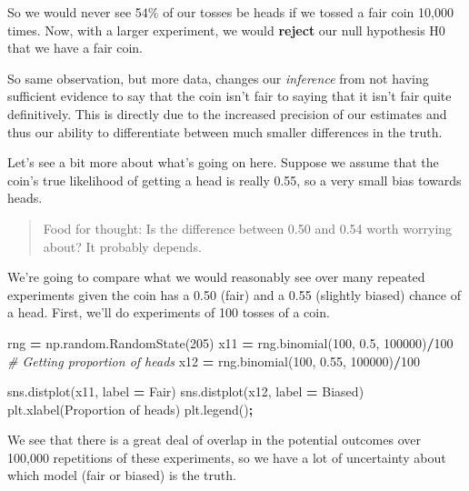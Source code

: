 \documentclass[
  letterpaper,
]{scrbook}
\newenvironment{Shaded}{\begin{snugshade}}{\end{snugshade}}
\newcommand{\CommentTok}[1]{\textcolor[rgb]{0.56,0.35,0.01}{\textit{#1}}}
\newcommand{\DecValTok}[1]{\textcolor[rgb]{0.00,0.00,0.81}{#1}}
\newcommand{\FloatTok}[1]{\textcolor[rgb]{0.00,0.00,0.81}{#1}}
\newcommand{\NormalTok}[1]{#1}
\newcommand{\OperatorTok}[1]{\textcolor[rgb]{0.81,0.36,0.00}{\textbf{#1}}}
\newcommand{\StringTok}[1]{\textcolor[rgb]{0.31,0.60,0.02}{#1}}
\begin{document}
So we would never see 54\% of our tosses be heads if we tossed a fair coin 10,000 times. Now, with a larger experiment, we would \textbf{reject} our null hypothesis H0 that we have a fair coin.

So same observation, but more data, changes our \emph{inference} from not having sufficient evidence to say that the coin isn't fair to saying that it isn't fair quite definitively. This is directly due to the increased precision of our estimates and thus our ability to differentiate between much smaller differences in the truth.

Let's see a bit more about what's going on here. Suppose we assume that the coin's true likelihood of getting a head is really 0.55, so a very small bias towards heads.

\begin{quote}
Food for thought: Is the difference between 0.50 and 0.54 worth worrying about? It probably depends.
\end{quote}

We're going to compare what we would reasonably see over many repeated experiments given the coin has a 0.50 (fair) and a 0.55 (slightly biased) chance of a head. First, we'll do experiments of 100 tosses of a coin.

\begin{Shaded}
\begin{Highlighting}[]
\NormalTok{rng }\OperatorTok{=}\NormalTok{ np.random.RandomState(}\DecValTok{205}\NormalTok{)}
\NormalTok{x11 }\OperatorTok{=}\NormalTok{ rng.binomial(}\DecValTok{100}\NormalTok{, }\FloatTok{0.5}\NormalTok{, }\DecValTok{100000}\NormalTok{)}\OperatorTok{/}\DecValTok{100} \CommentTok{\# Getting proportion of heads}
\NormalTok{x12 }\OperatorTok{=}\NormalTok{ rng.binomial(}\DecValTok{100}\NormalTok{, }\FloatTok{0.55}\NormalTok{, }\DecValTok{100000}\NormalTok{)}\OperatorTok{/}\DecValTok{100} 

\NormalTok{sns.distplot(x11, label }\OperatorTok{=} \StringTok{\textquotesingle{}Fair\textquotesingle{}}\NormalTok{)}
\NormalTok{sns.distplot(x12, label }\OperatorTok{=} \StringTok{\textquotesingle{}Biased\textquotesingle{}}\NormalTok{)}
\NormalTok{plt.xlabel(}\StringTok{\textquotesingle{}Proportion of heads\textquotesingle{}}\NormalTok{)}
\NormalTok{plt.legend()}\OperatorTok{;}
\end{Highlighting}
\end{Shaded}

We see that there is a great deal of overlap in the potential outcomes over 100,000 repetitions of these experiments, so we have a lot of uncertainty about which model (fair or biased) is the truth.
\end{document}
